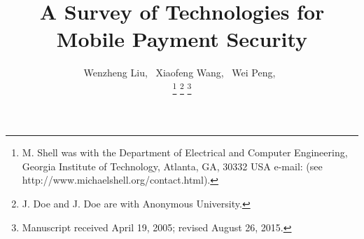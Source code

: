 \documentclass[journal]{IEEEtran}
\begin{document}
%
\title{A Survey of Technologies for Mobile Payment Security 
}
%
%
%

\author{Wenzheng Liu,~
        Xiaofeng Wang,~
        Wei Peng,~
        
\thanks{M. Shell was with the Department
of Electrical and Computer Engineering, Georgia Institute of Technology, Atlanta,
GA, 30332 USA e-mail: (see http://www.michaelshell.org/contact.html).}%
\thanks{J. Doe and J. Doe are with Anonymous University.}%
\thanks{Manuscript received April 19, 2005; revised August 26, 2015.}}

% 
%
\end{document}
